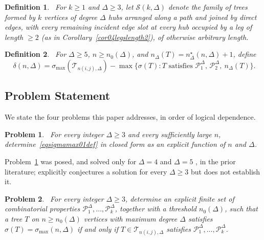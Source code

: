 \documentclass[12pt]{amsart}
\newtheorem{definition}{Definition}
\newtheorem{problem}{Problem}
\newcommand{\TT}{\mathcal{T}}
\begin{document}
\begin{definition}~\label{deffleg002}
For $k\geqslant 1$ and $\Delta\geqslant 3$, let $\mathcal S(k,\Delta)$ denote the family of trees formed by $k$ vertices of degree $\Delta$ hubs arranged along a path and joined by direct edges, with every remaining incident edge slot at every hub
occupied by a leg of length $\ge2$ (as in Corollary~\ref{cor04legslength2}),
of otherwise arbitrary length.
\end{definition}



\begin{definition}~\label{def001optimalitygap}
For $\Delta\geqslant 5$, $n\geqslant n_0(\Delta)$, and $n_\Delta(T)=n_\Delta^\star(n,\Delta)+1$,  define
\begin{equation}~\label{eqqdelta001def}
\delta(n,\Delta)\!=\! \sigma_{\max}(\TT_{n(i,j), \Delta}) \!-\! \max\big\{\sigma(T): T \text{ satisfies } \mathcal P_1^\Delta,\,\mathcal P_2^\Delta,\ n_\Delta(T)\big\}.
\end{equation}
\end{definition}

\subsection{Problem Statement}
We state the four problems this paper addresses, in order of logical dependence. 

\begin{problem}~\label{prob01primal}
For every integer $\Delta\geqslant 3$ and every sufficiently large $n$, determine~\eqref{eqsigmamax01def} in closed form as an explicit function of $n$ and $\Delta$.
\end{problem}

Problem~\ref{prob01primal} was posed, and solved only for $\Delta=4$ \cite{VukicevicEtAl2024} and $\Delta=5$ \cite{DimitrovPaper2025}, in the prior
literature; \cite{DimitrovPaper2025} explicitly conjectures a solution for every $\Delta\geqslant 3$ but does not establish it. 

\begin{problem}~\label{prob02structural}
For every integer $\Delta\geqslant 3$, determine an explicit finite set of combinatorial properties $\mathcal P_1^\Delta,\dots,\mathcal P_k^\Delta$, together with a
threshold $n_0(\Delta)$, such that a tree $T$ on $n\geqslant  n_0(\Delta)$ vertices
with maximum degree $\Delta$ satisfies $\sigma(T)=\sigma_{\max}(n,\Delta)$ if
and only if $T\in \TT_{n(i,j), \Delta}$ satisfies  $\mathcal P_1^\Delta,\dots,\mathcal P_k^\Delta$.
\end{problem}
\end{document}
